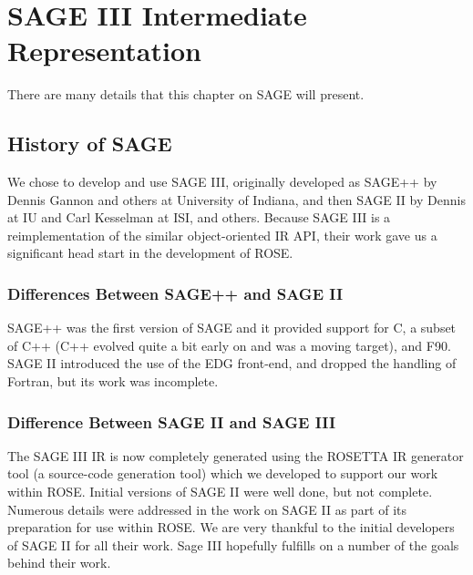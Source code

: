 \chapter{SAGE III Intermediate Representation}
\label{SageIII}

There are many details that this chapter on SAGE will present.



\section{History of SAGE}
    We chose to develop and use SAGE III, originally 
developed as SAGE++ by Dennis Gannon and others at University 
of Indiana, and then SAGE II by Dennis at IU and Carl Kesselman at ISI,
and others.  Because SAGE III is a reimplementation of the similar
object-oriented IR API, their work gave us a significant head 
start in the development of ROSE.

\subsection{Differences Between SAGE++ and SAGE II}
     SAGE++ was the first version of SAGE and it provided
support for C, a subset of C++ (C++ evolved quite a bit early on
and was a moving target), and F90. SAGE II introduced the use
of the EDG front-end, and dropped the handling of Fortran, 
but its work was incomplete.

\subsection{Difference Between SAGE II and SAGE III}
   The SAGE III IR is now completely generated using the ROSETTA
IR generator tool (a source-code generation tool) which we
developed to support our work within ROSE.  Initial versions 
of SAGE II were well done, but not complete.  Numerous 
details were addressed in the work on SAGE II as part of its 
preparation for use within ROSE.  We are very thankful to the 
initial developers of SAGE II for all their work.  Sage III
hopefully fulfills on a number of the goals behind their work.


